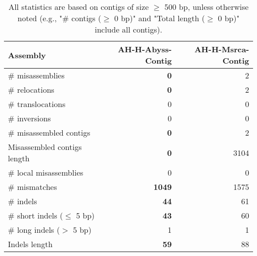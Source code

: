 \documentclass[12pt,a4paper]{article}
\begin{document}
\begin{table}[ht]
\begin{center}
\caption{All statistics are based on contigs of size $\geq$ 500 bp, unless otherwise noted (e.g., "\# contigs ($\geq$ 0 bp)" and "Total length ($\geq$ 0 bp)" include all contigs).}
\begin{tabular}{|l*{2}{|r}|}
\hline
Assembly & AH-H-Abyss-Contig & AH-H-Msrca-Contig \\ \hline
\# misassemblies & {\bf 0} & 2 \\ \hline
\hspace{5mm}\# relocations & {\bf 0} & 2 \\ \hline
\hspace{5mm}\# translocations & 0 & 0 \\ \hline
\hspace{5mm}\# inversions & 0 & 0 \\ \hline
\# misassembled contigs & {\bf 0} & 2 \\ \hline
Misassembled contigs length & {\bf 0} & 3104 \\ \hline
\# local misassemblies & 0 & 0 \\ \hline
\# mismatches & {\bf 1049} & 1575 \\ \hline
\# indels & {\bf 44} & 61 \\ \hline
\hspace{5mm}\# short indels ($\leq$ 5 bp) & {\bf 43} & 60 \\ \hline
\hspace{5mm}\# long indels ($>$ 5 bp) & 1 & 1 \\ \hline
Indels length & {\bf 59} & 88 \\ \hline
\end{tabular}
\end{center}
\end{table}
\end{document}
